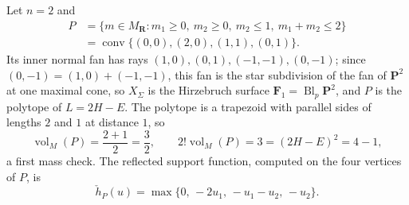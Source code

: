 \begin{example}
\label{ex:ch08-toric-hirzebruch}
Let $n=2$ and
\[
 \begin{aligned}
 P&=\{m\in M_{\mathbf R}:m_1\geq0,\ m_2\geq0,\
       m_2\leq1,\ m_1+m_2\leq2\}\\
  &=\operatorname{conv}\{(0,0),(2,0),(1,1),(0,1)\} .
 \end{aligned}
\]
Its inner normal fan has rays $(1,0),(0,1),(-1,-1),(0,-1)$; since
$(0,-1)=(1,0)+(-1,-1)$, this fan is the star subdivision of the fan of
$\mathbf P^2$ at one maximal cone, so $X_\Sigma$ is the Hirzebruch surface
$\mathbf F_1=\operatorname{Bl}_p\mathbf P^2$, and $P$ is the polytope of
$L=2H-E$.  The polytope is a trapezoid with parallel sides of lengths $2$
and $1$ at distance $1$, so
\[
 \operatorname{vol}_M(P)=\frac{2+1}{2}=\frac32 ,
 \qquad
 2!\operatorname{vol}_M(P)=3=(2H-E)^2=4-1 ,
\]
a first mass check.  The reflected support function, computed on the four
vertices of $P$, is
\[
 \check h_P(u)=\max\{0,\,-2u_1,\,-u_1-u_2,\,-u_2\} .
\]


\end{example}
